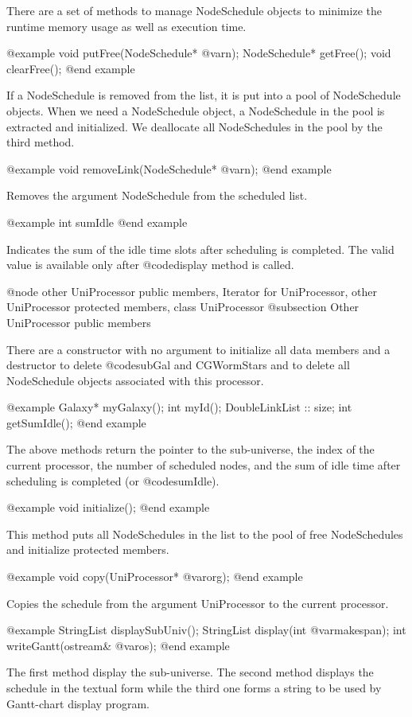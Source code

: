 There are a set of methods to manage NodeSchedule objects to minimize
the runtime memory usage as well as execution time.

@example
void putFree(NodeSchedule* @var{n});
NodeSchedule* getFree();
void clearFree();
@end example

If a NodeSchedule is removed from the list, it is put into a pool of
NodeSchedule objects. When we need a NodeSchedule object, a NodeSchedule
in the pool is extracted and initialized. We deallocate all NodeSchedules in
the pool by the third method.

@example
void removeLink(NodeSchedule* @var{n});
@end example

Removes the argument NodeSchedule from the scheduled list.

@example
int sumIdle
@end example

Indicates the sum of the idle time slots after scheduling is completed.
The valid value is available only after @code{display} method is called.

@node other UniProcessor public members, Iterator for UniProcessor, other UniProcessor protected members, class UniProcessor
@subsection Other UniProcessor public members

There are a constructor with no argument to initialize all data members and
a destructor to delete @code{subGal} and CGWormStars and to delete all
NodeSchedule objects associated with this processor.

@example
Galaxy* myGalaxy();
int myId();
DoubleLinkList :: size;
int getSumIdle();
@end example

The above methods return the pointer to the sub-universe, the index of
the current processor, the number of scheduled nodes, and the sum of idle
time after scheduling is completed (or @code{sumIdle}).

@example
void initialize();
@end example

This method puts all NodeSchedules in the list to the pool of free
NodeSchedules and initialize protected members.

@example
void copy(UniProcessor* @var{org});
@end example

Copies the schedule from the argument UniProcessor to the current processor.

@example
StringList displaySubUniv();
StringList display(int @var{makespan});
int writeGantt(ostream& @var{os});
@end example

The first method display the sub-universe. The second method displays the
schedule in the textual form while the third one forms a string to
be used by Gantt-chart display program.

